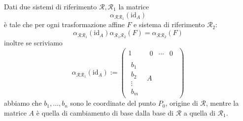 \documentclass[11pt]{scrartcl}
\begin{document}
   	 \begin{theorem}
   	 	Dati due sistemi di riferimento $\mathcal{R},\mathcal{R}_1$ la matrice 
   	 	$$\alpha_{\mathcal{R}\mathcal{R}_1}(\text{id}_A)$$
   	 	è tale che per ogni trasformazione affine $F$ e sistema di riferimento $\mathcal{R}_2$:
   	 	$$\alpha_{\mathcal{R}\mathcal{R}_1}(\text{id}_A)\alpha_{\mathcal{R}_1\mathcal{R}_2}(F)=\alpha_{\mathcal{R}\mathcal{R}_2}(F)$$
   	 	inoltre se scriviamo
   	 	$$\alpha_{\mathcal{R}\mathcal{R}_1}(\text{id}_A):=\left(\begin{array}{c|c}
   	 		1 & \begin{array}{ccc} 
   	 			0 & \cdots & 0
   	 		\end{array} \\
   	 		\hline
   	 		\begin{array}{c}
   	 			b_1 \\
   	 			b_2 \\
   	 			\vdots \\
   	 			b_m
   	 		\end{array} & A
   	 	\end{array}\right)$$
   	 	abbiamo che $b_1,\dots,b_n$ sono le coordinate del punto $P_0$, origine di $\mathcal{R}$, mentre la matrice $A$ è quella di cambiamento di base dalla base di $\mathcal{R}$ a quella di $\mathcal{R}_1$.
   	 \end{theorem}
   	 
\end{document}
